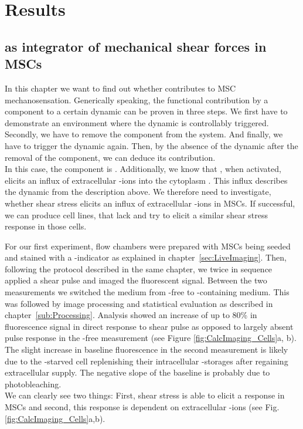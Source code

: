 \chapter{Results}



\section{\Piezo{} as integrator of mechanical shear forces in MSCs}
\label{sec:piezo1-as-integrator-of-biomecshanical-events-in-mscs}


In this chapter we want to find out whether \Piezo{} contributes to MSC mechanosensation. Generically speaking, the functional contribution by a component to a certain dynamic can be proven in three steps. We first have to demonstrate an environment where the dynamic is controllably triggered. Secondly, we have to remove the component from the system. And finally, we have to trigger the dynamic again. Then, by the absence of the dynamic after the removal of the component, we can deduce its contribution. \\
In this case, the component is \Piezo{}. Additionally, we know that \Piezo{}, when activated, elicits an influx of extracellular \calcium{}-ions into the cytoplasm \cite{Coste2010}. This influx describes the dynamic from the description above. We therefore need to investigate, whether shear stress elicits an influx of extracellular \calcium{}-ions in MSCs. If successful, we can produce cell lines, that lack \Piezo{} and try to elicit a similar shear stress response in those cells.

For our first experiment, flow chambers were prepared with MSCs being seeded and stained with a \calcium{}-indicator as explained in chapter~\vref{sec:LiveImaging}. Then, following the protocol described in the same chapter, we twice in sequence applied a shear pulse and imaged the fluorescent signal. Between the two measurements we switched the medium from \calcium{}-free to \calcium{}-containing medium. This was followed by image processing and statistical evaluation as described in chapter~\ref{sub:Processing}. Analysis showed an increase of up to 80\% in fluorescence signal in direct response to shear pulse as opposed to largely absent pulse response in the \calcium{}-free measurement (see Figure \ref{fig:CalcImaging_Cells}a, b). The slight increase in baseline fluorescence in the second  measurement is likely due to the \calcium{}-starved cell replenishing their intracellular \calcium{}-storages after regaining extracellular supply. The negative slope of the baseline is probably due to photobleaching. \\
We can clearly see two things: First, shear stress is able to elicit a response in MSCs and second, this response is dependent on extracellular \calcium{}-ions (see Fig. \ref{fig:CalcImaging_Cells}a,b). 


